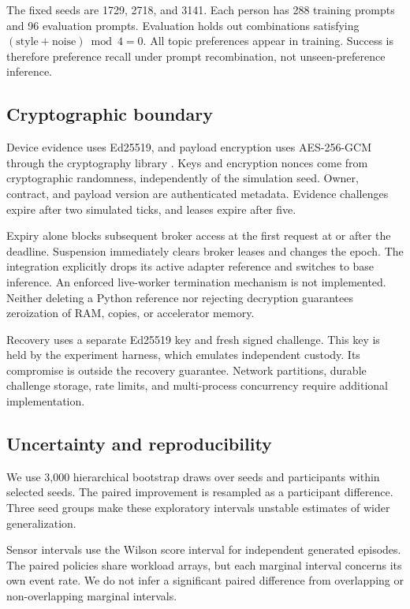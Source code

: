 \documentclass[11pt]{article}
\begin{document}
The fixed seeds are 1729, 2718, and 3141.
Each person has 288 training prompts and 96 evaluation prompts.
Evaluation holds out combinations satisfying $(\mathrm{style}+\mathrm{noise})\bmod4=0$.
All topic preferences appear in training.
Success is therefore preference recall under prompt recombination, not unseen-preference inference.

\subsection{Cryptographic boundary}
Device evidence uses Ed25519, and payload encryption uses AES-256-GCM through the cryptography library \cite{ed25519,aead}.
Keys and encryption nonces come from cryptographic randomness, independently of the simulation seed.
Owner, contract, and payload version are authenticated metadata.
Evidence challenges expire after two simulated ticks, and leases expire after five.

Expiry alone blocks subsequent broker access at the first request at or after the deadline.
Suspension immediately clears broker leases and changes the epoch.
The integration explicitly drops its active adapter reference and switches to base inference.
An enforced live-worker termination mechanism is not implemented.
Neither deleting a Python reference nor rejecting decryption guarantees zeroization of RAM, copies, or accelerator memory.

Recovery uses a separate Ed25519 key and fresh signed challenge.
This key is held by the experiment harness, which emulates independent custody.
Its compromise is outside the recovery guarantee.
Network partitions, durable challenge storage, rate limits, and multi-process concurrency require additional implementation.

\subsection{Uncertainty and reproducibility}
We use 3,000 hierarchical bootstrap draws over seeds and participants within selected seeds.
The paired improvement is resampled as a participant difference.
Three seed groups make these exploratory intervals unstable estimates of wider generalization.

Sensor intervals use the Wilson score interval for independent generated episodes.
The paired policies share workload arrays, but each marginal interval concerns its own event rate.
We do not infer a significant paired difference from overlapping or non-overlapping marginal intervals.
\end{document}
